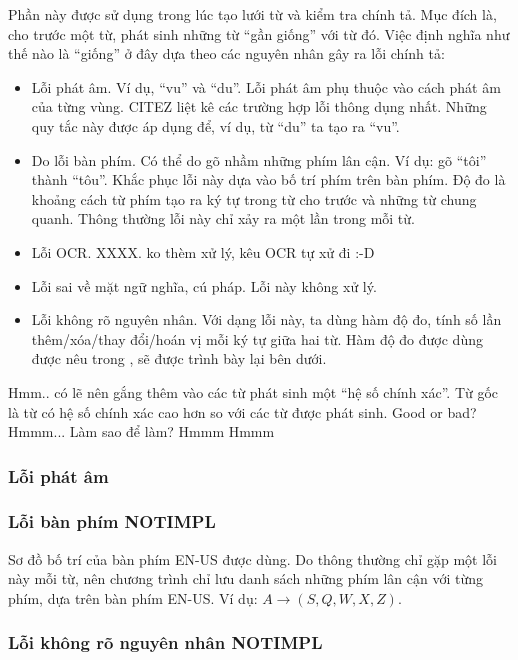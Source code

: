 \documentclass[a4paper]{book} %
\begin{document}
Phần này được sử dụng trong lúc tạo lưới từ và kiểm tra chính
tả. Mục đích là, cho trước một từ, phát sinh những từ ``gần giống''
với từ đó. Việc định nghĩa như thế nào là ``giống'' ở đây dựa theo các
nguyên nhân gây ra lỗi chính tả:
\begin{itemize}
\item Lỗi phát âm. Ví dụ, ``vu'' và ``du''. Lỗi phát âm phụ thuộc vào
  cách phát âm của từng vùng. CITEZ liệt kê các trường hợp lỗi thông
  dụng nhất. Những quy tắc này được áp dụng để, ví dụ, từ ``du'' ta
  tạo ra ``vu''.
\item Do lỗi bàn phím. Có thể do gõ nhầm những phím lân cận. Ví dụ: gõ
  ``tôi'' thành ``tôu''. Khắc phục lỗi này dựa vào bố trí phím trên
  bàn phím. Độ đo là khoảng cách từ phím tạo ra ký tự trong từ cho
  trước và những từ chung quanh. Thông thường lỗi này chỉ xảy ra một
  lần trong mỗi từ.
\item Lỗi OCR. XXXX. ko thèm xử lý, kêu OCR tự xử đi :-D
\item Lỗi sai về mặt ngữ nghĩa, cú pháp. Lỗi này không xử lý.
\item Lỗi không rõ nguyên nhân. Với dạng lỗi này, ta dùng hàm độ đo,
  tính số lần thêm/xóa/thay đổi/hoán vị mỗi ký tự giữa hai từ. Hàm độ đo
  được dùng được nêu trong \cite{Oflazer}, sẽ được trình bày lại bên
  dưới.
\end{itemize}


Hmm.. có lẽ nên gắng thêm vào các từ phát sinh một ``hệ số chính
xác''. Từ gốc là từ có hệ số chính xác cao hơn so với các từ được phát
sinh. Good or bad? Hmmm... Làm sao để làm? Hmmm Hmmm




\subsubsection{Lỗi phát âm}



\subsubsection{Lỗi bàn phím NOTIMPL}

Sơ đồ bố trí của bàn phím EN-US được dùng. Do thông thường chỉ gặp một
lỗi này mỗi từ, nên chương trình chỉ lưu danh sách những phím lân cận
với từng phím, dựa trên bàn phím EN-US. Ví dụ: $A \rightarrow (S,Q,W,X,Z)$.

\subsubsection{Lỗi không rõ nguyên nhân NOTIMPL}
\end{document}
